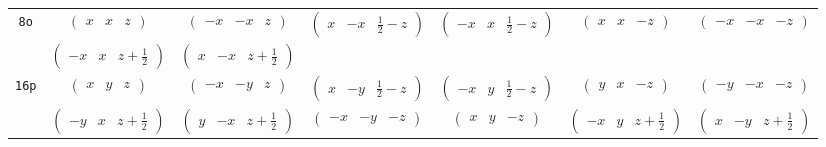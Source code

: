 \documentclass[fleqn,9pt,landscape]{jsarticle}
\begin{document}
\begin{center}
\begin{longtable}{ccccccc}
{\tt 8o} & $ \begin{pmatrix} x & x & z \end{pmatrix} $ & $ \begin{pmatrix} - x & - x & z \end{pmatrix} $ & $ \begin{pmatrix} x & - x & \frac{1}{2} - z \end{pmatrix} $ & $ \begin{pmatrix} - x & x & \frac{1}{2} - z \end{pmatrix} $ & $ \begin{pmatrix} x & x & - z \end{pmatrix} $ & $ \begin{pmatrix} - x & - x & - z \end{pmatrix} $ \\
& $ \begin{pmatrix} - x & x & z + \frac{1}{2} \end{pmatrix} $ & $ \begin{pmatrix} x & - x & z + \frac{1}{2} \end{pmatrix} $ & $  $ & $  $ & $  $ & $  $ \\ \hline
{\tt 16p} & $ \begin{pmatrix} x & y & z \end{pmatrix} $ & $ \begin{pmatrix} - x & - y & z \end{pmatrix} $ & $ \begin{pmatrix} x & - y & \frac{1}{2} - z \end{pmatrix} $ & $ \begin{pmatrix} - x & y & \frac{1}{2} - z \end{pmatrix} $ & $ \begin{pmatrix} y & x & - z \end{pmatrix} $ & $ \begin{pmatrix} - y & - x & - z \end{pmatrix} $ \\
& $ \begin{pmatrix} - y & x & z + \frac{1}{2} \end{pmatrix} $ & $ \begin{pmatrix} y & - x & z + \frac{1}{2} \end{pmatrix} $ & $ \begin{pmatrix} - x & - y & - z \end{pmatrix} $ & $ \begin{pmatrix} x & y & - z \end{pmatrix} $ & $ \begin{pmatrix} - x & y & z + \frac{1}{2} \end{pmatrix} $ & $ \begin{pmatrix} x & - y & z + \frac{1}{2} \end{pmatrix} $ \\

\end{longtable}
\end{center}
\end{document}
